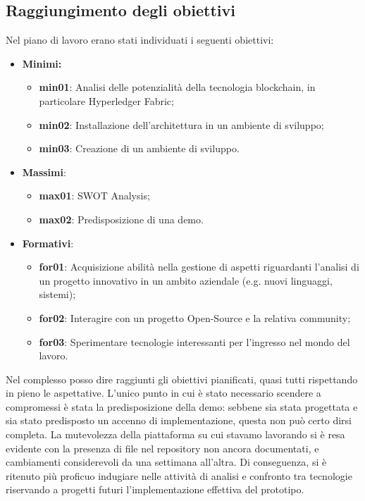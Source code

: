 	\subsection{Raggiungimento degli obiettivi}
		Nel piano di lavoro erano stati individuati i seguenti obiettivi:
		\begin{itemize}
			\item \textbf{Minimi:}
				\begin{itemize}
					\item \textbf{min01}: Analisi delle potenzialità della tecnologia blockchain, in particolare Hyperledger Fabric;
					\item \textbf{min02}: Installazione dell’architettura in un ambiente di sviluppo;
					\item \textbf{min03}: Creazione di un ambiente di sviluppo.
				\end{itemize}
			
			\item \textbf{Massimi}:
				\begin{itemize}
					\item \textbf{max01}: SWOT Analysis;
					\item \textbf{max02}: Predisposizione di una demo.
				\end{itemize}
			
			\item \textbf{Formativi}:
				\begin{itemize}
					\item \textbf{for01}: Acquisizione abilità nella gestione di aspetti riguardanti l’analisi di un progetto innovativo in un ambito aziendale (e.g. nuovi linguaggi, sistemi);
					\item \textbf{for02}: Interagire con un progetto Open-Source e la relativa community;
					\item \textbf{for03}: Sperimentare tecnologie interessanti per l’ingresso nel mondo del lavoro.
				\end{itemize}
		\end{itemize}
		
		Nel complesso posso dire raggiunti gli obiettivi pianificati, quasi tutti rispettando in pieno le aspettative. L'unico punto in cui è stato necessario scendere a compromessi è stata la predisposizione della demo: sebbene sia stata progettata e sia stato predisposto un accenno di implementazione, questa non può certo dirsi completa. La mutevolezza della piattaforma su cui stavamo lavorando si è resa evidente con la presenza di file nel repository non ancora documentati, e cambiamenti considerevoli da una settimana all'altra. Di conseguenza, si è ritenuto più proficuo indugiare nelle attività di analisi e confronto tra tecnologie riservando a progetti futuri l'implementazione effettiva del prototipo.
		
